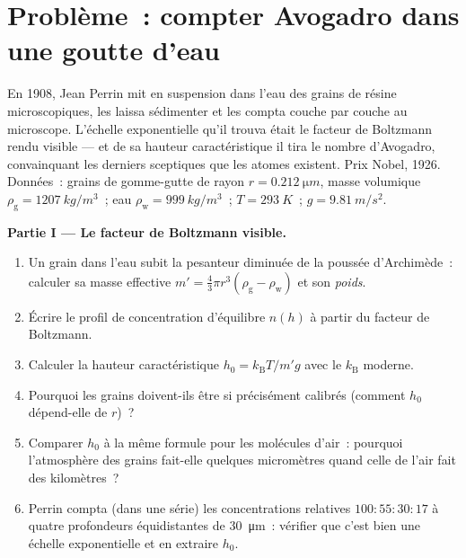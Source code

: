 \section{Problème~: compter Avogadro dans une goutte d'eau}

\begin{problem}\label{pb:b3:canonical-ensemble:1}
En 1908, Jean Perrin mit en suspension dans l'eau des grains de résine
microscopiques, les laissa sédimenter et les compta couche par couche
au microscope. L'échelle exponentielle qu'il trouva était le facteur
de Boltzmann rendu visible --- et de sa hauteur caractéristique il
tira le nombre d'Avogadro, convainquant les derniers sceptiques que
les atomes existent. Prix Nobel, 1926. Données~: grains de gomme-gutte
de rayon $r =
\qty{0.212}{\micro m}$, masse volumique $\rho_{\text{g}} =
\qty{1207}{kg/m^3}$~; eau $\rho_{\text{w}} = \qty{999}{kg/m^3}$~;
$T = \qty{293}{K}$~; $g = \qty{9.81}{m/s^2}$.

\medskip\noindent\textbf{Partie I --- Le facteur de Boltzmann visible.}
\begin{enumerate}
  \item Un grain dans l'eau subit la pesanteur diminuée de la poussée
        d'Archimède~: calculer sa masse effective $m' = \tfrac43\pi r^3(\rho_{\text{g}}
        - \rho_{\text{w}})$ et son \emph{poids}.
  \item Écrire le profil de concentration d'équilibre $n(h)$ à
        partir du facteur de Boltzmann.
  \item Calculer la hauteur caractéristique $h_0 = k_{\text{B}}T/m'g$
        avec le $k_{\text{B}}$ moderne.
  \item Pourquoi les grains doivent-ils être si précisément
        calibrés (comment $h_0$ dépend-elle de $r$)~?
  \item Comparer $h_0$ à la même formule pour les molécules d'air~:
        pourquoi l'atmosphère des grains fait-elle quelques
        micromètres quand celle de l'air fait des kilomètres~?
  \item Perrin compta (dans une série) les concentrations relatives
        $100 : 55 : 30 : 17$ à quatre profondeurs équidistantes de
        \qty{30}{\micro m}~: vérifier que c'est bien une échelle
        exponentielle et en extraire $h_0$.
\end{enumerate}


\end{problem}
